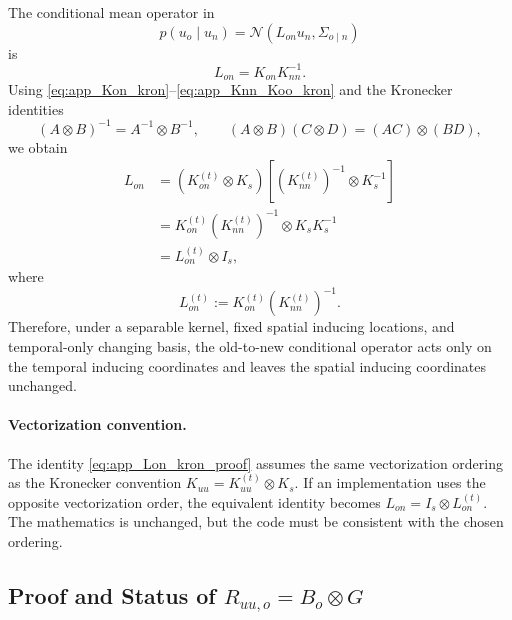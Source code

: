 \documentclass[12pt]{article}
\begin{document}
The conditional mean operator in
\begin{equation}
    p(u_o\mid u_n)
    =
    \mathcal{N}
    \left(
        L_{on}u_n,
        \Sigma_{o\mid n}
    \right)
\end{equation}
is
\begin{equation}
    L_{on}
    =
    K_{on}K_{nn}^{-1}.
\end{equation}
Using \eqref{eq:app_Kon_kron}--\eqref{eq:app_Knn_Koo_kron} and the
Kronecker identities
\begin{equation}
    (A\otimes B)^{-1}=A^{-1}\otimes B^{-1},
    \qquad
    (A\otimes B)(C\otimes D)=(AC)\otimes(BD),
\end{equation}
we obtain
\begin{align}
    L_{on}
    &=
    \left(
        K_{on}^{(t)}\otimes K_s
    \right)
    \left[
        \left(K_{nn}^{(t)}\right)^{-1}
        \otimes
        K_s^{-1}
    \right]                                                     \\
    &=
    K_{on}^{(t)}
    \left(K_{nn}^{(t)}\right)^{-1}
    \otimes
    K_sK_s^{-1}                                                  \\
    &=
    L_{on}^{(t)}\otimes I_s,
    \label{eq:app_Lon_kron_proof}
\end{align}
where
\begin{equation}
    L_{on}^{(t)}
    :=
    K_{on}^{(t)}
    \left(K_{nn}^{(t)}\right)^{-1}.
\end{equation}
Therefore, under a separable kernel, fixed spatial inducing locations, and
temporal-only changing basis, the old-to-new conditional operator acts
only on the temporal inducing coordinates and leaves the spatial inducing
coordinates unchanged.

\paragraph{Vectorization convention.}
The identity \eqref{eq:app_Lon_kron_proof} assumes the same vectorization
ordering as the Kronecker convention \(K_{uu}=K_{uu}^{(t)}\otimes K_s\).
If an implementation uses the opposite vectorization order, the equivalent
identity becomes \(L_{on}=I_s\otimes L_{on}^{(t)}\). The mathematics is
unchanged, but the code must be consistent with the chosen ordering.

\subsection{\texorpdfstring{Proof and Status of \(R_{uu,o}=B_o\otimes G\)}{Proof and Status of Ruu,o = Bo tensor G}}
\label{app:proof_Ro_kron_natural_stat}
\end{document}
